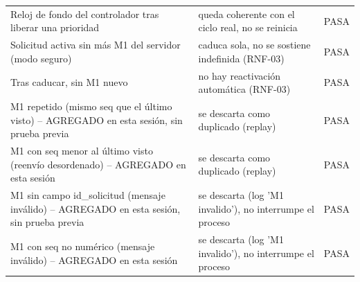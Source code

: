 \begin{table}[H]
\begin{tabular}{p{5.2cm}p{4.5cm}p{1.6cm}}
Reloj de fondo del controlador tras liberar una prioridad & queda coherente con el ciclo real, no se reinicia & PASA \\
Solicitud activa sin más M1 del servidor (modo seguro) & caduca sola, no se sostiene indefinida (RNF-03) & PASA \\
Tras caducar, sin M1 nuevo & no hay reactivación automática (RNF-03) & PASA \\
M1 repetido (mismo seq que el último visto) -- AGREGADO en esta sesión, sin prueba previa & se descarta como duplicado (replay) & PASA \\
M1 con seq menor al último visto (reenvío desordenado) -- AGREGADO en esta sesión & se descarta como duplicado (replay) & PASA \\
M1 sin campo id\_solicitud (mensaje inválido) -- AGREGADO en esta sesión, sin prueba previa & se descarta (log 'M1 invalido'), no interrumpe el proceso & PASA \\
M1 con seq no numérico (mensaje inválido) -- AGREGADO en esta sesión & se descarta (log 'M1 invalido'), no interrumpe el proceso & PASA \\
\bottomrule
\end{tabular}
\end{table}
